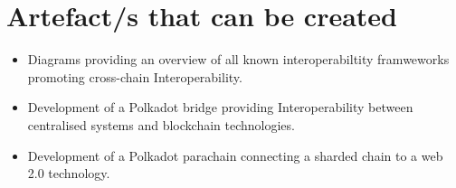\documentclass[12pt]{article}
\begin{document}
\section{Artefact/s that can be created}
\begin{itemize}
    \item Diagrams providing an overview of all known interoperabiltity framweworks promoting cross-chain Interoperability.
    \item Development of a Polkadot bridge providing Interoperability between centralised systems and blockchain technologies.
    \item Development of a Polkadot parachain connecting a sharded chain to a web 2.0 technology.
\end{itemize}

\printbibliography
\end{document}
